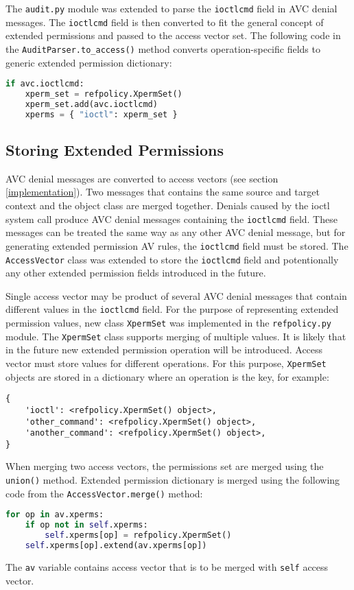 The \texttt{audit.py} module was extended to parse the \texttt{ioctlcmd} field
in AVC denial messages. The \texttt{ioctlcmd} field is then converted to fit the
general concept of extended permissions and passed to the access vector set. The
following code in the \texttt{AuditParser.to\_access()} method converts
operation-specific fields to generic extended permission dictionary:
\begin{lstlisting}[language=Python]
if avc.ioctlcmd:
    xperm_set = refpolicy.XpermSet()
    xperm_set.add(avc.ioctlcmd)
    xperms = { "ioctl": xperm_set }
\end{lstlisting}

\subsection{Storing Extended Permissions}
AVC denial messages are converted to access vectors (see section
\ref{implementation}). Two messages that contains the same source and target
context and the object class are merged together. Denials caused by the ioctl
system call produce AVC denial messages containing the \texttt{ioctlcmd} field.
These messages can be treated the same way as any other AVC denial message, but
for generating extended permission AV rules, the \texttt{ioctlcmd} field must be
stored. The \texttt{AccessVector} class was extended to store the
\texttt{ioctlcmd} field and potentionally any other extended permission fields
introduced in the future.

Single access vector may be product of several AVC denial messages that contain
different values in the \texttt{ioctlcmd} field. For the purpose of representing
extended permission values, new class \texttt{XpermSet} was implemented in the
\texttt{refpolicy.py} module. The \texttt{XpermSet} class supports merging of
multiple values. It is likely that in the future new extended permission
operation will be introduced. Access vector must store values for different
operations. For this purpose, \texttt{XpermSet} objects are stored in a
dictionary where an operation is the key, for example:
\begin{lstlisting}
{
    'ioctl': <refpolicy.XpermSet() object>,
    'other_command': <refpolicy.XpermSet() object>,
    'another_command': <refpolicy.XpermSet() object>,
}
\end{lstlisting}

When merging two access vectors, the permissions set are merged using the
\texttt{union()} method. Extended permission dictionary is merged using the
following code from the \texttt{AccessVector.merge()} method:
\begin{lstlisting}[language=Python]
for op in av.xperms:
    if op not in self.xperms:
        self.xperms[op] = refpolicy.XpermSet()
    self.xperms[op].extend(av.xperms[op])
\end{lstlisting}
The \texttt{av} variable contains access vector that is to be merged with
\texttt{self} access vector.

